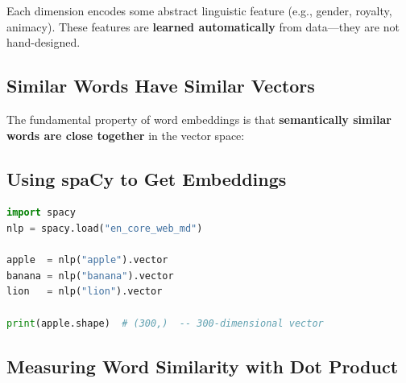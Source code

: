 \documentclass[11pt,a4paper]{article}
\begin{document}
Each dimension encodes some abstract linguistic feature (e.g., gender, royalty, animacy). These features are \textbf{learned automatically} from data---they are not hand-designed.

\subsection{Similar Words Have Similar Vectors}

The fundamental property of word embeddings is that \textbf{semantically similar words are close together} in the vector space:

\begin{center}
\end{center}

\subsection{Using spaCy to Get Embeddings}

\begin{lstlisting}[language=Python]
import spacy
nlp = spacy.load("en_core_web_md")

apple  = nlp("apple").vector
banana = nlp("banana").vector
lion   = nlp("lion").vector

print(apple.shape)  # (300,)  -- 300-dimensional vector
\end{lstlisting}

\subsection{Measuring Word Similarity with Dot Product}
\end{document}
